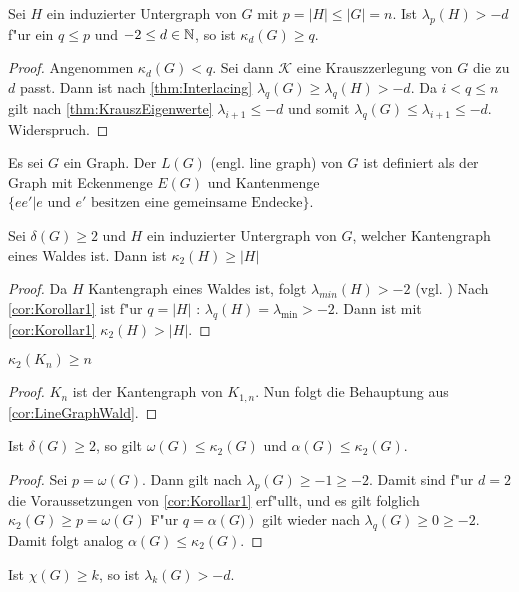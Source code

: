 \begin{corollary}
  \label{cor:Korollar1}
  Sei $H$ ein induzierter Untergraph von $G$ mit $p = \left| H\right| \leq \left|G\right| = n$.
  Ist $\lambda_p (H) > -d $ f"ur ein $q \leq p$ und $-2 \leq d \in {\mathbb{N}}$, so ist $\kappa_d(G) \geq q$.
\end{corollary}
\begin{proof}
  Angenommen $\kappa_d(G) < q$. Sei dann $\mathcal{K}$ eine Krauszzerlegung von $G$ die zu $d$ passt. Dann ist nach \ref{thm:Interlacing} $\lambda_{q}(G)\geq \lambda_{q}(H) > -d$. 
  Da $i < q \leq n$ gilt nach \ref{thm:KrauszEigenwerte} $\lambda_{i+1}\leq -d$ und somit $\lambda_{q}(G)\leq \lambda_{i+1} \leq -d$. Widerspruch.
\end{proof}
Es sei $G$ ein Graph. Der  $L(G)$ (engl. line graph) von $G$ ist definiert als der Graph mit Eckenmenge $E(G)$ und Kantenmenge $\{ee'|e\text{ und } e' \text{ besitzen eine gemeinsame Endecke}\}$.

\begin{corollary}
  \label{cor:LineGraphWald}
  Sei $\delta(G) \geq 2$ und $H$ ein induzierter Untergraph von $G$, welcher Kantengraph eines Waldes ist. 
  Dann ist $\kappa_{2}(H)\geq \left|H\right|$
\end{corollary}

\begin{proof}
  Da $H$ Kantengraph eines Waldes ist, folgt $\lambda_{min}(H) > -2$ (vgl. \cite[3.4.10]{zbMATH05625877}) 
  Nach \ref{cor:Korollar1} ist f"ur $q=\left|H\right|$ : $\lambda_q(H)=\lambda_{\text{min}}> -2$. Dann ist mit \ref{cor:Korollar1} $\kappa_{2}\left( H \right) > \left| H\right|$.
\end{proof}

\begin{corollary}[Klotz]
  $\kappa_{2}\left( K_n \right) \geq n$
\end{corollary}

\begin{proof}
  $K_n$ ist der Kantengraph von $K_{1,n}$. Nun folgt die Behauptung aus \ref{cor:LineGraphWald}.
\end{proof}
\begin{corollary}
  Ist $\delta\left( G \right) \geq 2$, so gilt $\omega\left( G \right)\leq \kappa_{2}\left( G \right)$ und $\alpha\left( G \right)\leq \kappa_{2}\left( G \right)$.
  \label{cor:alphaomegakrausz}
\end{corollary}

\begin{proof}
  Sei $p = \omega(G)$. Dann gilt nach $\lambda_{p}\left( G \right)\geq -1\geq -2$. Damit sind f"ur $d=2$ die Voraussetzungen von \ref{cor:Korollar1} erf"ullt, und es gilt folglich $\kappa_{2}\left( G \right)\geq p = \omega\left( G \right)$ 
  F"ur $q=\alpha\left( G) \right)$ gilt wieder nach $\lambda_{q}\left( G \right)\geq 0 \geq -2$. Damit folgt analog $\alpha\left( G \right) \leq \kappa_{2}\left( G \right)$.
\end{proof}
\begin{conjecture}
  \label{con:MainConjecture}
  Ist $\chi\left( G \right) \geq k$, so ist $\lambda_k\left( G \right) > -d$.
\end{conjecture}

